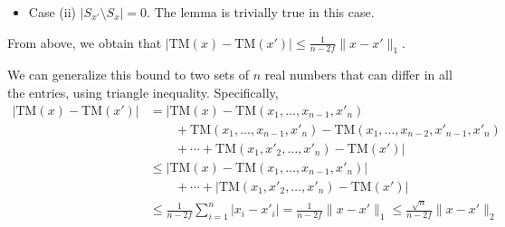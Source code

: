 \documentclass[twoside,11pt]{article}
\begin{document}
\begin{itemize}
\begin{itemize}
\begin{itemize}
\begin{align*}
            \end{align*} 
            \item[] Sub-case (d) $x_{\overline{\iota}} \in S_{x'}$. In this case, $x_\iota' \geq x_{\overline{\iota}}$. Therefore,
            \begin{align*}
                \textstyle |\mathrm{TM}(x) - \mathrm{TM}(x')| = \frac{1}{n-2f}|x_{\overline{\iota}}-x_\iota| \leq \frac{1}{n-2f}|x'_\iota-x_\iota| .
            \end{align*} 
        \end{itemize}
        \item[$\circ$] By symmetry, we obtain the same result for the case when $\iota \notin S_x$ but $\iota \in S_{x'}$.
        \end{itemize}
    \item Case (ii) $| S_{x'} \setminus S_{x} | = 0$. The lemma is trivially true in this case.
\end{itemize}
From above, we obtain that $|\mathrm{TM}(x)-\mathrm{TM}(x')| \leq \frac{1}{n-2f} \|x-x'\|_1$.

We can generalize this bound to two sets of $n$ real numbers that can differ in all the entries, using triangle inequality. Specifically,
\begin{align*}
    |\mathrm{TM}(x)-\mathrm{TM}(x')|
    & = | \mathrm{TM}(x)-\mathrm{TM}(x_1,\ldots, x_{n-1}, x'_n) \\ & \qquad + \mathrm{TM}(x_1,\ldots, x_{n-1}, x'_n) - \mathrm{TM}(x_1,\ldots, x_{n-2}, x'_{n-1}, x'_n) \\ & \qquad + \cdots + \mathrm{TM}(x_1, x'_2, \ldots, x'_n) - \mathrm{TM}(x') | \\
    & \leq | \mathrm{TM}(x)-\mathrm{TM}(x_1,\ldots, x_{n-1}, x'_n)| \\ & \qquad + \cdots + |\mathrm{TM}(x_1, x'_2, \ldots, x'_n)-\mathrm{TM}(x') |\\ 
    & \leq \frac{1}{n-2f} \sum_{i=1}^n |x_i-x'_i| 
    = \frac{1}{n-2f} \|x-x'\|_1
    \leq \frac{\sqrt{n}}{n-2f} \|x-x'\|_2 \tag*{\BlackBox}
\end{align*}
\end{document}
